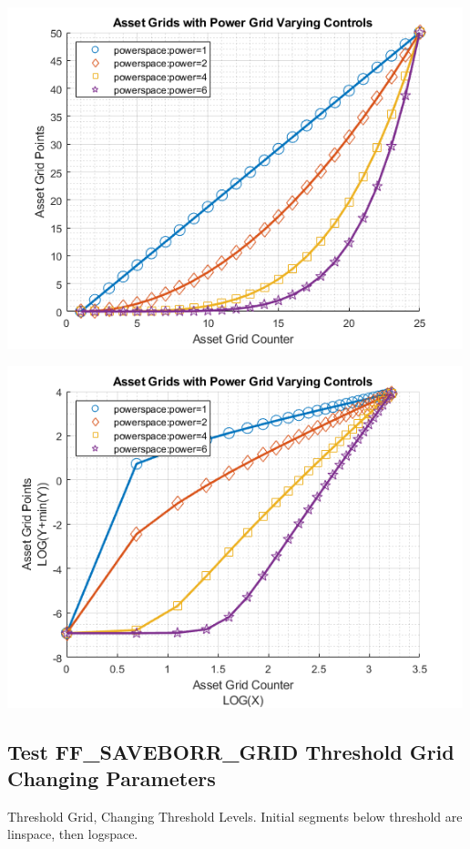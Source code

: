 \documentclass[
]{book}
\begin{document}
\includegraphics[width=5.20833in,height=\textheight]{img/fx_saveborr_grid_images/figure_4.png}

\includegraphics[width=5.20833in,height=\textheight]{img/fx_saveborr_grid_images/figure_5.png}

\hypertarget{test-ff_saveborr_grid-threshold-grid-changing-parameters}{%
\subsection{Test FF\_SAVEBORR\_GRID Threshold Grid Changing Parameters}\label{test-ff_saveborr_grid-threshold-grid-changing-parameters}}

Threshold Grid, Changing Threshold Levels. Initial segments below
threshold are linspace, then logspace.
\end{document}
